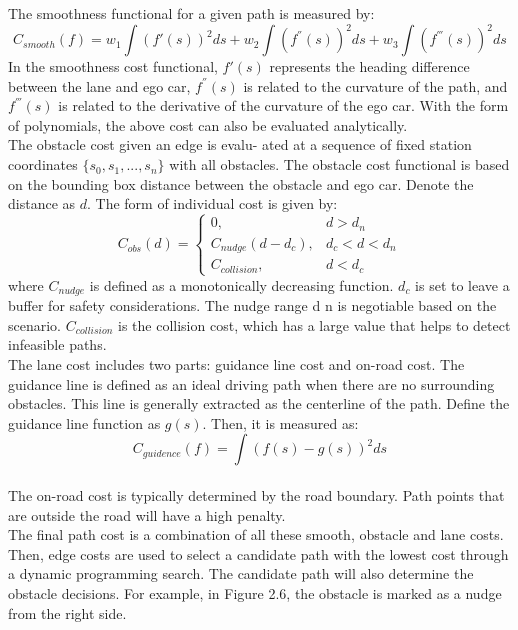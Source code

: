 \documentclass{thesisreport}
\begin{document}
\indent
The smoothness functional for a given path is measured by:
\begin{equation}
C_{smooth}(f) = w_1 \int (f'(s))^2 ds + w_2 \int (f^{''}(s))^2 ds + w_3 \int (f^{'''}(s))^2 ds
\end{equation}
In the smoothness cost functional, $f'(s)$ represents the heading difference between the lane and ego car, $f^{''}(s)$ is related to the curvature of the path, and $f^{'''}(s)$ is related to the derivative of the curvature of the ego car. With the form of polynomials, the above cost can also be evaluated analytically. \\
\indent
The obstacle cost given an edge is evalu-
ated at a sequence of fixed station coordinates $\{s_0 , s_1 , ..., s_n \}$ with all obstacles. The obstacle cost functional is based on the bounding box distance between the obstacle and ego car. Denote the distance as $d$. The form of individual cost is given
by:
\begin{equation}
C_{obs}(d) = 
\begin{cases}
0, & d > d_n\\
C_{nudge}(d - d_c), & d_c < d < d_n\\
C_{collision}, & d< d_c
\end{cases}
\end{equation}
where $C_{nudge}$ is defined as a monotonically decreasing function. $d_c$ is set to leave a buffer for safety considerations. The nudge range d n is negotiable based on the scenario. $C_{collision}$ is the collision cost, which has a large value that helps to detect infeasible paths.\\
\indent
The lane cost includes two parts: guidance line cost and on-road cost. The guidance line is defined as an ideal driving path when there are no surrounding obstacles. This line is generally extracted as the centerline of the path. Define the guidance line function as $g(s)$. Then, it is measured as:
\begin{equation}
C_{guidence}(f) = \int (f(s)-g(s))^2 ds
\end{equation}\\
\indent
The on-road cost is typically determined by the road boundary. Path points that are outside the road will have a high penalty.\\
\indent
The final path cost is a combination of all these smooth, obstacle and lane costs. Then, edge costs are used to select a candidate path with the lowest cost through a dynamic programming search. The candidate path will also determine the obstacle decisions. For example, in Figure 2.6, the obstacle is marked as a nudge from the right side.
\end{document}
